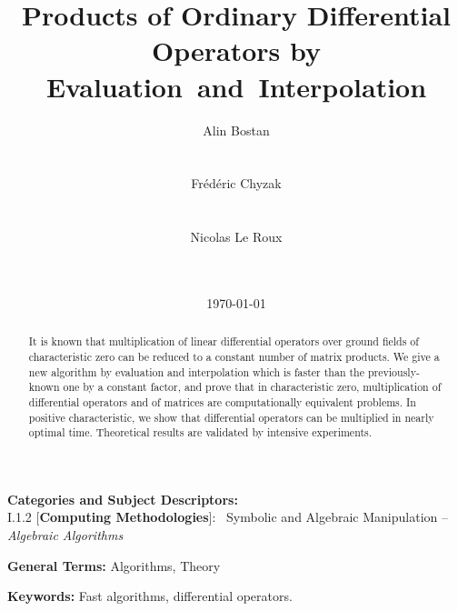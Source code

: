 \documentclass{sig-alt-full}
\begin{document}
\title{Products of Ordinary Differential Operators by Evaluation~and~Interpolation}

\author{
\alignauthor Alin Bostan\\
\\
\\
\alignauthor Fr\'ed\'eric Chyzak \\
\\
\\
\alignauthor Nicolas Le Roux\\
\\
\\
}

\date{\today}
\maketitle

\begin{abstract}
It is known that multiplication of linear differential operators over ground fields of characteristic zero can be reduced to a constant number of matrix products.
We give a new algorithm by evaluation and interpolation which is faster than the previously-known one by a constant factor, and
prove that in characteristic zero, multiplication of differential operators and of matrices are computationally equivalent problems.
In positive characteristic, we show that differential operators can be multiplied in nearly optimal time. 
Theoretical results are validated by intensive experiments.
\end{abstract}

\vspace{1mm}
 \noindent
 {\bf Categories and Subject Descriptors:} \\
\noindent I.1.2 [{\bf Computing Methodologies}]:{~} Symbolic and Algebraic
  Manipulation -- \emph{Algebraic Algorithms}
 
 \vspace{1mm}
 \noindent
 {\bf General Terms:} Algorithms, Theory
 
 \vspace{1mm}
 \noindent
 {\bf Keywords:} Fast algorithms, differential operators.
\end{document}
